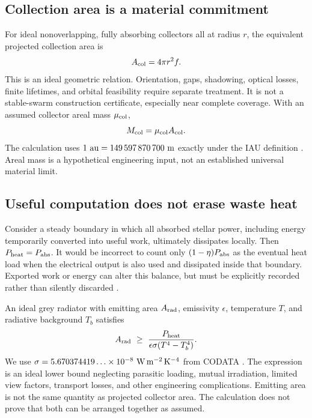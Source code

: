 \documentclass[11pt,letterpaper]{article}
\newcommand{\1}{\mathbf 1}
\theoremstyle{remark}\newtheorem{remark}{Remark}[section]
\begin{document}
\subsection{Collection area is a material commitment}
For ideal nonoverlapping, fully absorbing collectors all at radius $r$, the equivalent projected collection area is
\begin{equation}\label{eq:collection}
 A_{\rm col}=4\pi r^2 f.
\end{equation}
This is an ideal geometric relation. Orientation, gaps, shadowing, optical losses, finite lifetimes, and orbital feasibility require separate treatment. It is not a stable-swarm construction certificate, especially near complete coverage. With an assumed collector areal mass $\mu_{\rm col}$,
\begin{equation}
 M_{\rm col}=\mu_{\rm col}A_{\rm col}.
\end{equation}
The calculation uses $1\ {\rm au}=149\,597\,870\,700\ {\rm m}$ exactly under the IAU definition \citep{iau2012}. Areal mass is a hypothetical engineering input, not an established universal material limit.

\subsection{Useful computation does not erase waste heat}
Consider a steady boundary in which all absorbed stellar power, including energy temporarily converted into useful work, ultimately dissipates locally. Then $P_{\rm heat}=P_{\rm abs}$. It would be incorrect to count only $(1-\eta)P_{\rm abs}$ as the eventual heat load when the electrical output is also used and dissipated inside that boundary. Exported work or energy can alter this balance, but must be explicitly recorded rather than silently discarded \citep{wright}.

An ideal grey radiator with emitting area $A_{\rm rad}$, emissivity $\epsilon$, temperature $T$, and radiative background $T_b$ satisfies
\begin{equation}\label{eq:radiator}
 A_{\rm rad}\ \ge\ \frac{P_{\rm heat}}{\epsilon\sigma(T^4-T_b^4)}.
\end{equation}
We use $\sigma=5.670374419\ldots\times10^{-8}\ {\rm W\,m^{-2}\,K^{-4}}$ from CODATA \citep{nist}. The expression is an ideal lower bound neglecting parasitic loading, mutual irradiation, limited view factors, transport losses, and other engineering complications. Emitting area is not the same quantity as projected collector area. The calculation does not prove that both can be arranged together as assumed.
\end{document}
